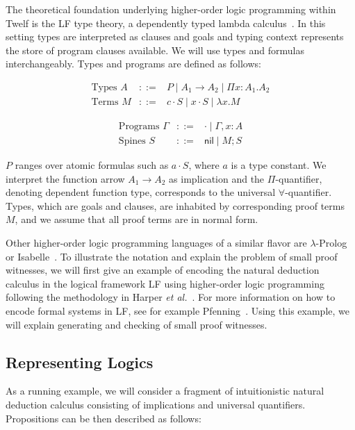 \documentclass{llncs}
\newcommand{\comb}{\cdot}
\newcommand{\nil}{\mathsf{nil}}
\begin{document}
The theoretical foundation underlying higher-order logic programming
within Twelf is the LF type theory, a dependently
typed lambda calculus~\cite{Pfenning91lf}. In this setting types are interpreted as
clauses and goals and typing context represents the store of program
clauses available. We will use types and formulas
interchangeably. Types and programs are defined as follows: 

\begin{minipage}[b]{6cm}
\[
\begin{array}{lcl}
\mbox{Types } A & ::= & P \mid  A_1 \rightarrow A_2 \mid \Pi x:A_1.A_2 \\
\mbox{Terms }  M & ::= & c \comb S \mid x \comb S \mid \lambda x. M  
\end{array}
\]
\end{minipage}
\begin{minipage}[b]{6cm}
\[
\begin{array}{lcl}
\mbox{Programs }  \Gamma & ::= & \cdot \mid \Gamma, x:A \\
\mbox{Spines } S & ::= & \nil \mid M ; S
\end{array}
\]
\end{minipage}

$P$ ranges over atomic formulas such as $a \cdot S$, where $a$ is a
type constant. We interpret the function arrow $A_1 \rightarrow A_2$
as implication and the $\Pi$-quantifier, denoting dependent function
type, corresponds to the universal $\forall$-quantifier. Types, which
are goals and clauses, are inhabited by corresponding proof terms $M$,
and we assume that all proof terms are in normal form. 

Other higher-order logic programming languages of a similar flavor are
$\lambda$-Prolog~\cite{Nadathur99cade} or
Isabelle~\cite{Paulson86}. To illustrate the notation and explain the
problem of small proof witnesses, we will first give an example of
encoding the natural deduction calculus in the logical framework LF
using higher-order logic programming following the methodology in
Harper {\em et al.}~\cite{Harper93jacm}. For more information on how to
encode formal systems in LF, see for example
Pfenning~\cite{Pfenning97}.  Using this example, we will explain
generating and checking of small proof witnesses.

\subsection{Representing Logics}
As a running example, we will consider a fragment of intuitionistic natural
deduction calculus consisting of implications and universal quantifiers. Propositions can
be then described as follows:
\end{document}
